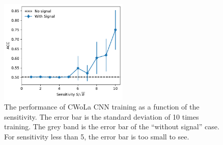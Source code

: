 \documentclass[12pt]{article}
\begin{document}
		\begin{figure}[htpb]
			\centering
			\includegraphics[width=0.55\textwidth]{HVmodel_CWoLa_CNN.pdf}
			\caption{The performance of CWoLa CNN training as a function of the sensitivity. The error bar is the standard deviation of 10 times training. The grey band is the error bar of the ``without signal'' case. For sensitivity less than 5, the error bar is too small to see.}
			\label{fig:cwola_hunting_cnn_acc}
		\end{figure}	



		
\end{document}
